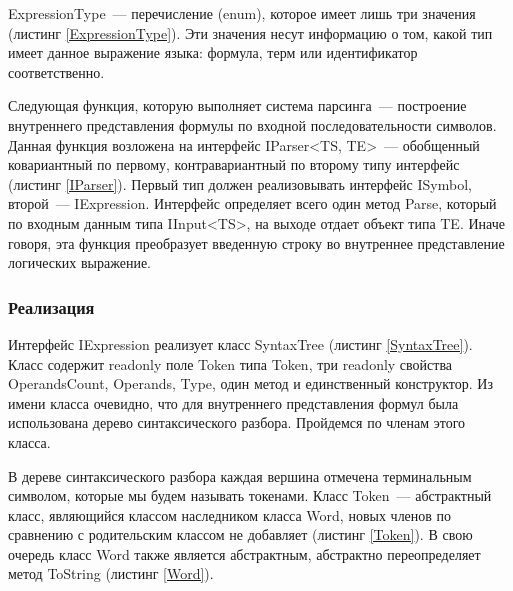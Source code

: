 ExpressionType~--- перечисление (enum), которое имеет лишь три значения (листинг \ref{ExpressionType}). Эти значения несут информацию о том, какой тип имеет данное выражение языка: формула, терм или идентификатор соответственно.





Следующая функция, которую выполняет система парсинга~--- построение внутреннего представления формулы по входной последовательности символов. Данная функция возложена на интерфейс IParser<TS, TE>~--- обобщенный ковариантный по первому, контравариантный по второму типу интерфейс (листинг \ref{IParser}). Первый тип должен реализовывать интерфейс ISymbol, второй~--- IExpression. Интерфейс определяет всего один метод Parse, который по входным данным типа IInput<TS>, на выходе отдает объект типа TE. Иначе говоря, эта функция преобразует введенную строку во внутреннее представление логических выражение.



\subsubsection{Реализация}

Интерфейс IExpression реализует класс SyntaxTree (листинг \ref{SyntaxTree}). Класс содержит readonly поле Token типа Token, три readonly свойства OperandsCount, Operands, Type, один метод и единственный конструктор. Из имени класса очевидно, что для внутреннего представления формул была использована дерево синтаксического разбора. Пройдемся по членам этого класса.

В дереве синтаксического разбора каждая вершина отмечена терминальным символом, которые мы будем называть токенами. Класс Token~--- абстрактный класс, являющийся классом наследником класса Word, новых членов по сравнению с родительским классом не добавляет (листинг \ref{Token}). В свою очередь класс Word также является абстрактным, абстрактно переопределяет метод ToString (листинг \ref{Word}).



